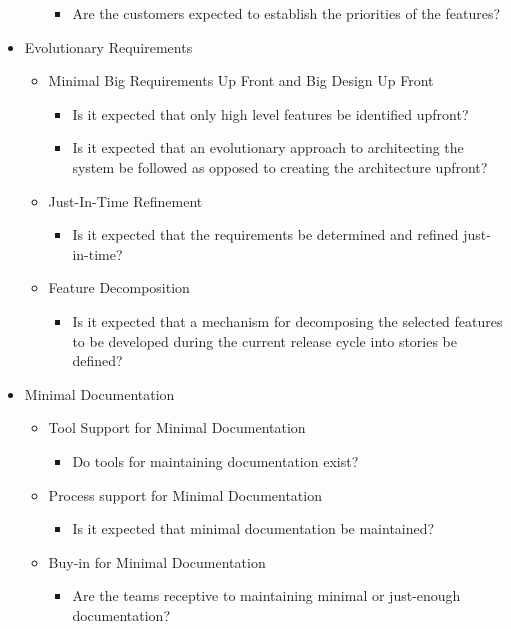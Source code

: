 \begin{appendices}
\begin{itemize}
\begin{itemize}
\begin{itemize}
					\item Are the customers expected to establish the priorities of the features?
				\end{itemize}
		\end{itemize}
	\item Evolutionary Requirements
		\begin{itemize}
			\item Minimal Big Requirements Up Front and Big Design Up Front
				\begin{itemize}
					\item Is it expected that only high level features be identified upfront?
					\item Is it expected that an evolutionary approach to architecting the system be followed as opposed to creating the architecture upfront?
				\end{itemize}
			\item Just-In-Time Refinement
				\begin{itemize}
					\item Is it expected that the requirements be determined and refined just-in-time?
				\end{itemize}
			\item Feature Decomposition
				\begin{itemize}
					\item Is it expected that a mechanism for decomposing the selected features to be developed during the current release cycle into stories be defined?
				\end{itemize}
		\end{itemize}
	\item Minimal Documentation
		\begin{itemize}
			\item Tool Support for Minimal Documentation
				\begin{itemize}
					\item Do tools for maintaining documentation exist?
				\end{itemize}
			\item Process support for Minimal Documentation
				\begin{itemize}
					\item Is it expected that minimal documentation be maintained?
				\end{itemize}
			\item Buy-in for Minimal Documentation
				\begin{itemize}
					\item Are the teams receptive to maintaining minimal or just-enough documentation?
				\end{itemize}
		\end{itemize}
\end{itemize}







\end{appendices}

